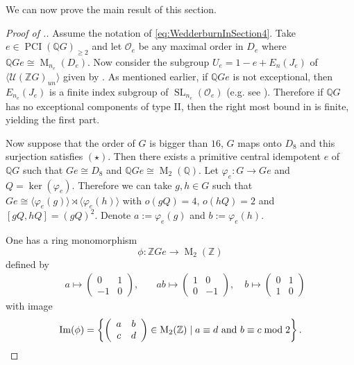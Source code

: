 \documentclass[a4paper,10pt]{amsart}
\theoremstyle{definition}
\theoremstyle{remark}
\newcommand\Ima{{\rm Im}}
\newcommand{\SL}{\operatorname{SL}}
\newcommand{\Ma}{\operatorname{M}}
\newcommand\PCI{\operatorname{PCI}}
\renewcommand{\O}{\mathcal{O}}
\newcommand{\U}{{\mathcal U}}
\newcommand{\Z}{{\mathbb Z}}
\newcommand{\Q}{{\mathbb Q}}
\begin{document}
We can now prove the main result of this section.

\begin{proof}[Proof of .]
Assume the notation of \eqref{eq:WedderburnInSection4}. Take $e \in \PCI (\Q G)_{\geq 2}$ and let $\O_e$ be any maximal order in $D_e$ where  $\Q G e \cong \Ma_{n_e}(D_e)$. Now consider the subgroup $U_e = 1 - e + E_n(J_e)$ of $\langle  \U(\Z G)_{un} \rangle$ given by . As mentioned earlier, if $\Q G e$ is not exceptional, then $E_{n_e}(J_e)$ is a finite index subgroup of $\SL_{n_e}(\O_e)$ (e.g. see \cite{Vas72, BakReh}). Therefore if $\Q G$ has no exceptional components of type II, then the right most bound in  is finite, yielding the first part. 

Now suppose that the order of $G$ is bigger than $16$, $G$ maps onto $D_8$ and this surjection satisfies $(\star)$. Then there exists a primitive central idempotent $e$ of $\Q G$ such that $Ge \cong D_8$ and $\Q Ge \cong \Ma_2(\Q)$. Let $\varphi_e : G \rightarrow Ge$ and $Q = \ker(\varphi_e).$ Therefore we can take $g,h \in G$ such that $Ge \cong \langle \varphi_e(g) \rangle \rtimes \langle \varphi_e(h) \rangle$ with $o(gQ) = 4$, $o(hQ) = 2$ and $[gQ,hQ] = (gQ)^2$. Denote $a := \varphi_e(g)$ and $b := \varphi_e(h)$.

One has a ring monomorphism
$$\phi: \Z Ge \rightarrow \Ma_2(\Z)$$ defined by 
\begin{align*}
\quad a \mapsto \left( \begin{array}{cc}
0 & 1  \\
-1 & 0
\end{array}\right),
& \quad ab \mapsto \left( \begin{array}{cc}
1 & 0  \\
0 & -1
\end{array}\right),
\quad b \mapsto \left( \begin{array}{cc}
0 & 1  \\
1 & 0
\end{array}\right)
\end{align*}
with image 
$$\Ima(\phi)= \left\{\left( \begin{array}{cc}
a & b  \\
c & d
\end{array}\right) \in  \Ma_2(\Z) \mid a\equiv d \text{ and } b \equiv c \bmod 2 \right\}.$$


\end{proof}
\end{document}
